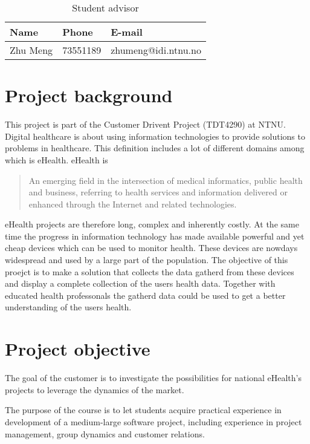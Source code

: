 \begin{table}
\begin{center}
\begin{tabular}{ l | l | l }
  \hline
  Name & Phone & E-mail \\
  \hline\noalign{\smallskip}\noalign{\smallskip}\hline
  Zhu Meng	& 73551189 & zhumeng@idi.ntnu.no \\
  \hline
\end{tabular}
\end{center}
\caption{Student advisor}
\label{table:advisor}
\end{table}


\newpage
\section{Project background}

This project is part of the Customer Drivent Project (TDT4290) at NTNU.
Digital healthcare is about using information technologies to provide solutions to problems in healthcare. This definition includes a lot of different domains among which is eHealth. eHealth is
\begin{quote}
An emerging field in the intersection of medical informatics, public health and business, referring to health services and information delivered or enhanced through the Internet and related technologies.\citep{ehealth}
\end{quote}
eHealth projects are therefore long, complex and inherently costly. At the same time the progress in information technology has made available powerful and yet cheap devices which can be used to monitor health. These devices are nowdays widespread and used by a large part of the population. The objective of this proejct is to make a solution that collects the data gatherd from these devices and display a complete collection of the users health data. Together with educated health professonals the gatherd data could be used to get a better understanding of the users health.

\section{Project objective}

The goal of the customer is to investigate the possibilities for national eHealth's projects to leverage the dynamics of the market.

The purpose of the course is to let students acquire practical experience in development of a medium-large software project,
including experience in project management, group dynamics and customer relations.


